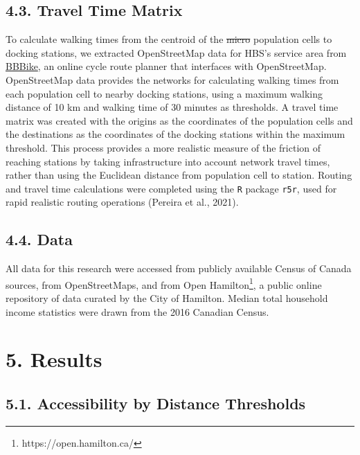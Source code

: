 \documentclass[]{elsarticle} %
\providecommand{\DIFdeltex}[1]{{\protect\color{red}\sout{#1}}}                      %
\providecommand{\DIFdelbegin}{} %
\providecommand{\DIFdelend}{} %
\providecommand{\DIFdel}[1]{\texorpdfstring{\DIFdeltex{#1}}{}} %
\newcommand{\DIFscaledelfig}{0.5}
\newlength{\DIFdelgraphicswidth} %
\newlength{\DIFdelgraphicsheight} %
\newcommand{\DIFdelincludegraphics}[2][]{%
\sbox{\DIFdelgraphicsbox}{\DIFOincludegraphics[#1]{#2}}%
\settoboxwidth{\DIFdelgraphicswidth}{\DIFdelgraphicsbox} %
\settoboxtotalheight{\DIFdelgraphicsheight}{\DIFdelgraphicsbox} %
\scalebox{\DIFscaledelfig}{%
\parbox[b]{\DIFdelgraphicswidth}{\usebox{\DIFdelgraphicsbox}\\[-\baselineskip] \rule{\DIFdelgraphicswidth}{0em}}\llap{\resizebox{\DIFdelgraphicswidth}{\DIFdelgraphicsheight}{%
\setlength{\unitlength}{\DIFdelgraphicswidth}%
\begin{picture}(1,1)%
\thicklines\linethickness{2pt} %
{\color[rgb]{1,0,0}\put(0,0){\framebox(1,1){}}}%
{\color[rgb]{1,0,0}\put(0,0){\line( 1,1){1}}}%
{\color[rgb]{1,0,0}\put(0,1){\line(1,-1){1}}}%
\end{picture}%
}\hspace*{3pt}}} %
} %
\DeclareRobustCommand{\DIFdelbegin}{\DIFOdelbegin \let\includegraphics\DIFdelincludegraphics} %
\DeclareRobustCommand{\DIFdelend}{\DIFOaddend \let\includegraphics\DIFOincludegraphics} %
\begin{document}
\hypertarget{travel-time-matrix}{%
\subsection{4.3. Travel Time Matrix}\label{travel-time-matrix}}

To calculate walking times from the centroid of the \DIFdelbegin \DIFdel{micro }\DIFdelend population cells to
docking stations, we extracted OpenStreetMap data for HBS's service area
from \href{https://download.bbbike.org/osm/bbbike/}{BBBike}, an online
cycle route planner that interfaces with OpenStreetMap. OpenStreetMap
data provides the networks for calculating walking times from each
population cell to nearby docking stations, using a maximum walking
distance of 10 km and walking time of 30 minutes as thresholds. A travel
time matrix was created with the origins as the coordinates of the
population cells and the destinations as the coordinates of the docking
stations within the maximum threshold. This process provides a more
realistic measure of the friction of reaching stations by taking
infrastructure into account network travel times, rather than using the
Euclidean distance from population cell to station. Routing and travel
time calculations were completed using the \texttt{R} package
\texttt{r5r}, used for rapid realistic routing operations (Pereira et
al., 2021).

\hypertarget{data}{%
\subsection{4.4. Data}\label{data}}

All data for this research were accessed from publicly available Census
of Canada sources, from OpenStreetMaps, and from Open
Hamilton\footnote{https://open.hamilton.ca/}, a public online repository
of data curated by the City of Hamilton. Median total household income
statistics were drawn from the 2016 Canadian Census.

\hypertarget{results}{%
\section{5. Results}\label{results}}

\hypertarget{accessibility-by-distance-thresholds}{%
\subsection{5.1. Accessibility by Distance
Thresholds}\label{accessibility-by-distance-thresholds}}
\end{document}
